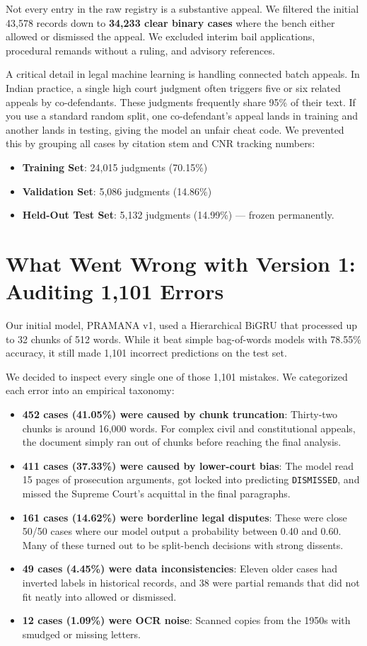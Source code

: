 \documentclass[11pt,a4paper]{article}
\begin{document}
Not every entry in the raw registry is a substantive appeal. We filtered the initial 43,578 records down to \textbf{34,233 clear binary cases} where the bench either allowed or dismissed the appeal. We excluded interim bail applications, procedural remands without a ruling, and advisory references.

A critical detail in legal machine learning is handling connected batch appeals. In Indian practice, a single high court judgment often triggers five or six related appeals by co-defendants. These judgments frequently share 95\% of their text. If you use a standard random split, one co-defendant's appeal lands in training and another lands in testing, giving the model an unfair cheat code. We prevented this by grouping all cases by citation stem and CNR tracking numbers:
\begin{itemize}
    \item \textbf{Training Set}: 24,015 judgments (70.15\%)
    \item \textbf{Validation Set}: 5,086 judgments (14.86\%)
    \item \textbf{Held-Out Test Set}: 5,132 judgments (14.99\%) --- frozen permanently.
\end{itemize}

\section{What Went Wrong with Version 1: Auditing 1,101 Errors}
Our initial model, PRAMANA v1, used a Hierarchical BiGRU that processed up to 32 chunks of 512 words. While it beat simple bag-of-words models with 78.55\% accuracy, it still made 1,101 incorrect predictions on the test set.

We decided to inspect every single one of those 1,101 mistakes. We categorized each error into an empirical taxonomy:
\begin{itemize}
    \item \textbf{452 cases (41.05\%) were caused by chunk truncation}: Thirty-two chunks is around 16,000 words. For complex civil and constitutional appeals, the document simply ran out of chunks before reaching the final analysis.
    \item \textbf{411 cases (37.33\%) were caused by lower-court bias}: The model read 15 pages of prosecution arguments, got locked into predicting \texttt{DISMISSED}, and missed the Supreme Court's acquittal in the final paragraphs.
    \item \textbf{161 cases (14.62\%) were borderline legal disputes}: These were close 50/50 cases where our model output a probability between 0.40 and 0.60. Many of these turned out to be split-bench decisions with strong dissents.
    \item \textbf{49 cases (4.45\%) were data inconsistencies}: Eleven older cases had inverted labels in historical records, and 38 were partial remands that did not fit neatly into allowed or dismissed.
    \item \textbf{12 cases (1.09\%) were OCR noise}: Scanned copies from the 1950s with smudged or missing letters.
\end{itemize}
\end{document}
